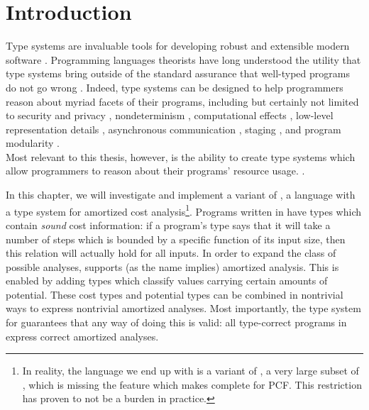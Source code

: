 \section{Introduction}
Type systems are invaluable tools for developing robust and extensible modern software \citehere. Programming languages theorists have long understood the utility that type systems bring outside of the standard assurance that well-typed programs do not go wrong \cite{milner:jcss78}. Indeed, type systems can be designed to help programmers reason about myriad facets of their programs, including but certainly not limited to security and privacy \cite{reed:icfp10}, nondeterminism \citehere, computational effects \cite{moggi91}, low-level representation details \cite{downen-et-al:icfp20}, asynchronous communication \cite{honda-et-al:16}, staging \cite{wickline-et-al}, and program modularity \cite{rossberg-et-al:jfp14}. 
\\

Most relevant to this thesis, however, is the ability to create type systems which allow programmers to reason about their programs' resource usage. .


In this chapter, we will investigate and implement a variant of \lambdaamor, a language with a type system for amortized cost analysis\footnote{
In reality, the language we end up with is a variant of \lambdaamorminus, a very large subset of \lambdaamor, which is missing the feature which makes \lambdaamor complete for PCF. This restriction has proven to not be a burden in practice.
}. Programs written in \lambdaamor have types which contain \textit{sound} cost information: if a program's type says that it will take a number of steps which is bounded by a specific function of its input size, then this relation will actually hold for all inputs. In order to expand the class of possible analyses, \lambdaamor supports (as the name implies) amortized analysis. This is enabled by adding types which classify values carrying certain amounts of potential. These cost types and potential types can be combined in nontrivial ways to express nontrivial amortized analyses. Most importantly, the type system for \lambdaamor guarantees that any way of doing this is valid: all type-correct programs in \lambdaamor express correct amortized analyses.

